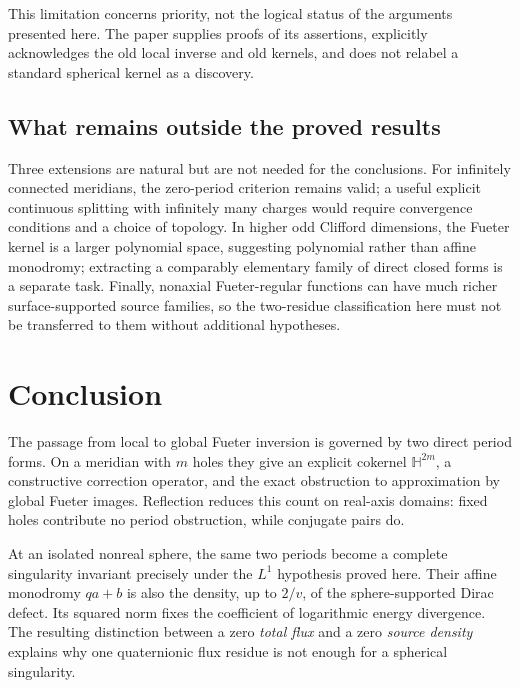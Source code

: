 \documentclass[11pt,a4paper]{article}
\numberwithin{equation}{section}
\theoremstyle{definition}
\theoremstyle{remark}
\newcommand{\HH}{\mathbb H}
\begin{document}
This limitation concerns priority, not the logical status of the arguments
presented here. The paper supplies proofs of its assertions, explicitly
acknowledges the old local inverse and old kernels, and does not relabel a
standard spherical kernel as a discovery.

\subsection{What remains outside the proved results}
Three extensions are natural but are not needed for the conclusions.
For infinitely connected meridians, the zero-period criterion remains valid;
a useful explicit continuous splitting with infinitely many charges would
require convergence conditions and a choice of topology. In higher odd
Clifford dimensions, the Fueter kernel is a larger polynomial space, suggesting
polynomial rather than affine monodromy; extracting a comparably elementary
family of direct closed forms is a separate task. Finally, nonaxial
Fueter-regular functions can have much richer surface-supported source
families, so the two-residue classification here must not be transferred to
them without additional hypotheses.

\section{Conclusion}
The passage from local to global Fueter inversion is governed by two direct
period forms. On a meridian with $m$ holes they give an explicit cokernel
$\HH^{2m}$, a constructive correction operator, and the exact obstruction to
approximation by global Fueter images. Reflection reduces this count on
real-axis domains: fixed holes contribute no period obstruction, while
conjugate pairs do.

At an isolated nonreal sphere, the same two periods become a complete
singularity invariant precisely under the $L^1$ hypothesis proved here.
Their affine monodromy $qa+b$ is also the density, up to $2/v$, of the
sphere-supported Dirac defect. Its squared norm fixes the coefficient of
logarithmic energy divergence. The resulting distinction between a zero
\emph{total flux} and a zero \emph{source density} explains why one
quaternionic flux residue is not enough for a spherical singularity.
\end{document}
